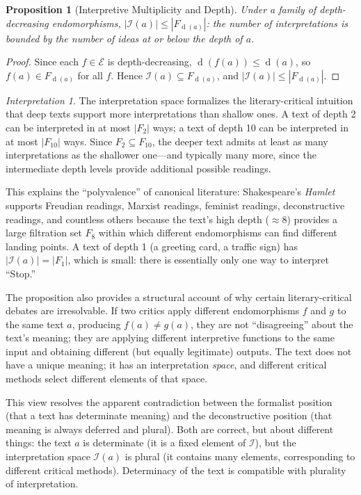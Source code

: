 \documentclass[11pt,openany]{book}
\theoremstyle{definition}
\theoremstyle{plain}
\newtheorem{proposition}[axiom]{Proposition}
\theoremstyle{remark}
\newtheorem{interpretation}[axiom]{Interpretation}
\newcommand{\IS}{\mathcal{I}}               %
\newcommand{\depth}{\operatorname{d}}       %
\begin{document}
\begin{proposition}[Interpretive Multiplicity and Depth]
Under a family of depth-decreasing endomorphisms, $|\mathcal{I}(a)| \leq |F_{\depth(a)}|$: the number of interpretations is bounded by the number of ideas at or below the depth of $a$.
\end{proposition}

\begin{proof}
Since each $f \in \mathcal{E}$ is depth-decreasing, $\depth(f(a)) \leq \depth(a)$, so $f(a) \in F_{\depth(a)}$ for all $f$. Hence $\mathcal{I}(a) \subseteq F_{\depth(a)}$, and $|\mathcal{I}(a)| \leq |F_{\depth(a)}|$.
\end{proof}

\begin{interpretation}
The interpretation space formalizes the literary-critical intuition that deep texts support more interpretations than shallow ones. A text of depth 2 can be interpreted in at most $|F_2|$ ways; a text of depth 10 can be interpreted in at most $|F_{10}|$ ways. Since $F_2 \subseteq F_{10}$, the deeper text admits at least as many interpretations as the shallower one---and typically many more, since the intermediate depth levels provide additional possible readings.

This explains the ``polyvalence'' of canonical literature: Shakespeare's \emph{Hamlet} supports Freudian readings, Marxist readings, feminist readings, deconstructive readings, and countless others because the text's high depth ($\approx 8$) provides a large filtration set $F_8$ within which different endomorphisms can find different landing points. A text of depth 1 (a greeting card, a traffic sign) has $|\mathcal{I}(a)| = |F_1|$, which is small: there is essentially only one way to interpret ``Stop.''

The proposition also provides a structural account of why certain literary-critical debates are irresolvable. If two critics apply different endomorphisms $f$ and $g$ to the same text $a$, producing $f(a) \neq g(a)$, they are not ``disagreeing'' about the text's meaning; they are applying different interpretive functions to the same input and obtaining different (but equally legitimate) outputs. The text does not have a unique meaning; it has an interpretation \emph{space}, and different critical methods select different elements of that space.

This view resolves the apparent contradiction between the formalist position (that a text has determinate meaning) and the deconstructive position (that meaning is always deferred and plural). Both are correct, but about different things: the text $a$ is determinate (it is a fixed element of $\IS$), but the interpretation space $\mathcal{I}(a)$ is plural (it contains many elements, corresponding to different critical methods). Determinacy of the text is compatible with plurality of interpretation.
\end{interpretation}
\end{document}
